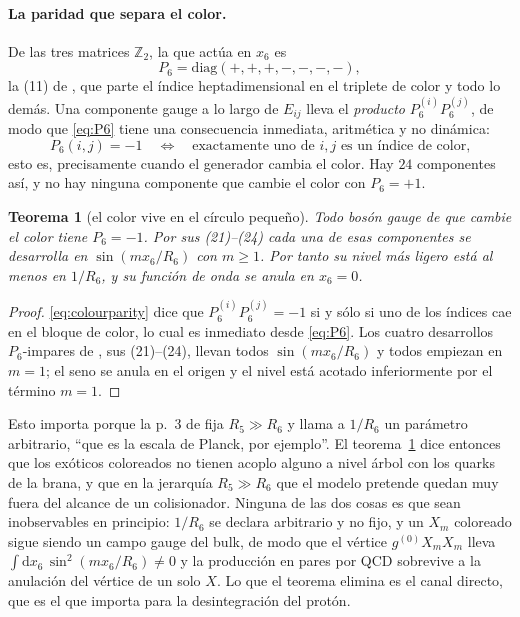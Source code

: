 \documentclass[11pt,a4paper]{article}
\newtheorem{theorem}{Teorema}
\newcommand{\ZZ}{\mathbb{Z}}
\begin{document}
\paragraph{La paridad que separa el color.} De las tres matrices $\ZZ_2$, la que actúa en $x_6$ es
\begin{equation}\label{eq:P6}
  P_6=\mathrm{diag}(+,+,+,-,-,-,-),
\end{equation}
la (11) de \cite{KM25}, que parte el índice heptadimensional en el triplete de color y todo lo
demás. Una componente gauge a lo largo de $E_{ij}$ lleva el \emph{producto} $P_6^{(i)}P_6^{(j)}$,
de modo que \eqref{eq:P6} tiene una consecuencia inmediata, aritmética y no dinámica:
\begin{equation}\label{eq:colourparity}
  P_6(i,j)=-1
  \quad\Longleftrightarrow\quad
  \text{exactamente uno de } i,j \text{ es un índice de color,}
\end{equation}
esto es, precisamente cuando el generador cambia el color. Hay $24$ componentes así, y no hay
ninguna componente que cambie el color con $P_6=+1$.

\begin{theorem}[el color vive en el círculo pequeño]\label{thm:colourparity}
Todo bosón gauge de \cite{KM25} que cambie el color tiene $P_6=-1$. Por sus (21)--(24) cada una de
esas componentes se desarrolla en $\sin(m x_6/R_6)$ con $m\ge1$. Por tanto su nivel más ligero está
al menos en $1/R_6$, y su función de onda \emph{se anula} en $x_6=0$.
\end{theorem}
\begin{proof}
\eqref{eq:colourparity} dice que $P_6^{(i)}P_6^{(j)}=-1$ si y sólo si uno de los índices cae en el
bloque de color, lo cual es inmediato desde \eqref{eq:P6}. Los cuatro desarrollos $P_6$-impares de
\cite{KM25}, sus (21)--(24), llevan todos $\sin(m x_6/R_6)$ y todos empiezan en $m=1$; el seno se
anula en el origen y el nivel está acotado inferiormente por el término $m=1$.
\end{proof}

\noindent Esto importa porque la p.~3 de \cite{KM25} fija $R_5\gg R_6$ y llama a $1/R_6$ un parámetro arbitrario, ``que es la escala de Planck, por
ejemplo''. El teorema~\ref{thm:colourparity}
dice entonces que los exóticos coloreados no tienen acoplo alguno a nivel árbol con los quarks de
la brana, y que en la jerarquía $R_5\gg R_6$ que el modelo pretende quedan muy fuera del alcance de
un colisionador. Ninguna de las dos cosas es que sean inobservables en principio: $1/R_6$ se
declara arbitrario y no fijo, y un $X_m$ coloreado sigue siendo un campo gauge del bulk, de modo
que el vértice $g^{(0)}X_mX_m$ lleva $\int\!\mathrm{d}x_6\,\sin^2(mx_6/R_6)\neq0$ y la producción
en pares por QCD sobrevive a la anulación del vértice de un solo $X$. Lo que el teorema elimina es
el canal directo, que es el que importa para la desintegración del protón.
\end{document}
